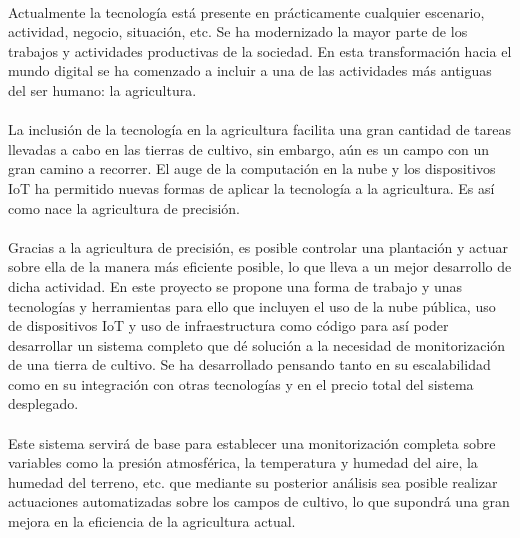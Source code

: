 \documentclass[../../memoria.tex]{subfiles}
\begin{document}
\paragraph{}
Actualmente la tecnología está presente en prácticamente cualquier escenario, actividad, negocio, situación, etc. Se ha modernizado la mayor parte de los trabajos y actividades productivas de la sociedad. En esta transformación hacia el mundo digital se ha comenzado a incluir a una de las actividades más antiguas del ser humano: la agricultura.

\paragraph{}
La inclusión de la tecnología en la agricultura facilita una gran cantidad de tareas llevadas a cabo en las tierras de cultivo, sin embargo, aún es un campo con un gran camino a recorrer. El auge de la computación en la nube y los dispositivos IoT ha permitido nuevas formas de aplicar la tecnología a la agricultura. Es así como nace la agricultura de precisión.

\paragraph{}
Gracias a la agricultura de precisión, es posible controlar una plantación y actuar sobre ella de la manera más eficiente posible, lo que lleva a un mejor desarrollo de dicha actividad. En este proyecto se propone una forma de trabajo y unas tecnologías y herramientas para ello que incluyen el uso de la nube pública, uso de dispositivos IoT y uso de infraestructura como código para así poder desarrollar un sistema completo que dé solución a la necesidad de monitorización de una tierra de cultivo. Se ha desarrollado pensando tanto en su escalabilidad como en su integración con otras tecnologías y en el precio total del sistema desplegado.

\paragraph{}
Este sistema servirá de base para establecer una monitorización completa sobre variables como la presión atmosférica, la temperatura y humedad del aire, la humedad del terreno, etc. que mediante su posterior análisis sea posible realizar actuaciones automatizadas sobre los campos de cultivo, lo que supondrá una gran mejora en la eficiencia de la agricultura actual.
\end{document}
